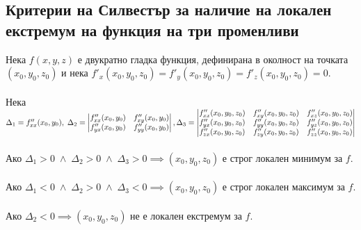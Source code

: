 \documentclass[14pt]{extarticle}
\begin{document}
\subsection*{Критерии на Силвестър за наличие на локален екстремум на функция на три променливи}
Нека \(f(x,y,z)\) е двукратно гладка функция, дефинирана в околност на точката \((x_0,y_0, z_0)\) и нека \(f'_x(x_0, y_0, z_0) = f'_y(x_0,y_0, z_0) = f'_z(x_0,y_0, z_0) = 0\). \\\\
Нека \(\Delta_1 = f''_{xx}(x_0, y_0), \; \Delta_2 = \begin{vmatrix}
    f''_{xx}(x_0, y_0) & f''_{xy}(x_0, y_0) \\
    f''_{yx}(x_0, y_0) & f''_{yy}(x_0, y_0)
\end{vmatrix}, \\\\\\
\Delta_3 = \begin{vmatrix}
    f''_{xx}(x_0, y_0, z_0) & f''_{xy}(x_0, y_0, z_0) & f''_{xz}(x_0, y_0, z_0) \\
    f''_{yx}(x_0, y_0, z_0) & f''_{yy}(x_0, y_0, z_0) & f''_{yz}(x_0, y_0, z_0) \\
    f''_{zx}(x_0, y_0, z_0) & f''_{zy}(x_0, y_0, z_0) & f''_{zz}(x_0, y_0, z_0)
\end{vmatrix} \)\\\\
Ако \(\Delta_1 > 0 \; \land \; \Delta_2 > 0 \; \land \; \Delta_3 > 0 \implies (x_0, y_0, z_0)\) е строг локален минимум за \(f\). \\\\
Ако \(\Delta_1 < 0 \; \land \; \Delta_2 > 0 \; \land \; \Delta_3 < 0 \implies (x_0, y_0, z_0)\) е строг локален максимум за \(f\). \\\\
Ако \(\Delta_2 < 0 \implies (x_0, y_0, z_0)\) не е локален екстремум за \(f\).
\end{document}
